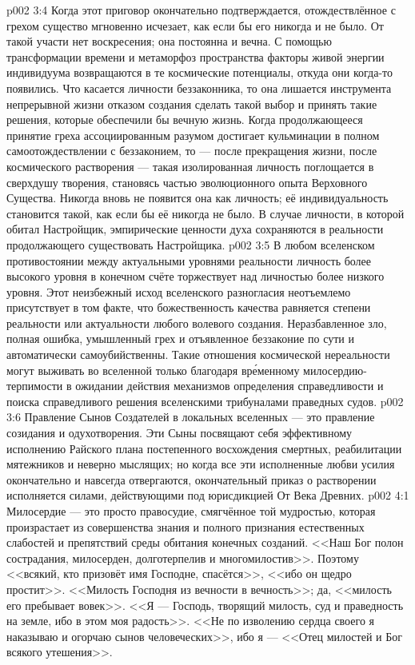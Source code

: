 \vs p002 3:4 Когда этот приговор окончательно подтверждается, отождествлённое с грехом существо мгновенно исчезает, как если бы его никогда и не было. От такой участи нет воскресения; она постоянна и вечна. С помощью трансформации времени и метаморфоз пространства факторы живой энергии индивидуума возвращаются в те космические потенциалы, откуда они когда\hyp{}то появились. Что касается личности беззаконника, то она лишается инструмента непрерывной жизни отказом создания сделать такой выбор и принять такие решения, которые обеспечили бы вечную жизнь. Когда продолжающееся принятие греха ассоциированным разумом достигает кульминации в полном самоотождествлении с беззаконием, то --- после прекращения жизни, после космического растворения --- такая изолированная личность поглощается в сверхдушу творения, становясь частью эволюционного опыта Верховного Существа. Никогда вновь не появится она как личность; её индивидуальность становится такой, как если бы её никогда не было. В случае личности, в которой обитал Настройщик, эмпирические ценности духа сохраняются в реальности продолжающего существовать Настройщика.
\vs p002 3:5 \pc В любом вселенском противостоянии между актуальными уровнями реальности личность более высокого уровня в конечном счёте торжествует над личностью более низкого уровня. Этот неизбежный исход вселенского разногласия неотъемлемо присутствует в том факте, что божественность качества равняется степени реальности или актуальности любого волевого создания. Неразбавленное зло, полная ошибка, умышленный грех и отъявленное беззаконие по сути и автоматически самоубийственны. Такие отношения космической нереальности могут выживать во вселенной только благодаря вр\'еменному милосердию\hyp{}терпимости в ожидании действия механизмов определения справедливости и поиска справедливого решения вселенскими трибуналами праведных судов.
\vs p002 3:6 Правление Сынов Создателей в локальных вселенных --- это правление созидания и одухотворения. Эти Сыны посвящают себя эффективному исполнению Райского плана постепенного восхождения смертных, реабилитации мятежников и неверно мыслящих; но когда все эти исполненные любви усилия окончательно и навсегда отвергаются, окончательный приказ о растворении исполняется силами, действующими под юрисдикцией От Века Древних.
\vs p002 4:1 Милосердие --- это просто правосудие, смягчённое той мудростью, которая произрастает из совершенства знания и полного признания естественных слабостей и препятствий среды обитания конечных созданий. <<Наш Бог полон сострадания, милосерден, долготерпелив и многомилостив>>. Поэтому <<всякий, кто призовёт имя Господне, спасётся>>, <<ибо он щедро простит>>. <<Милость Господня из вечности в вечность>>; да, <<милость его пребывает вовек>>. <<Я --- Господь, творящий милость, суд и праведность на земле, ибо в этом моя радость>>. <<Не по изволению сердца своего я наказываю и огорчаю сынов человеческих>>, ибо я --- <<Отец милостей и Бог всякого утешения>>.
